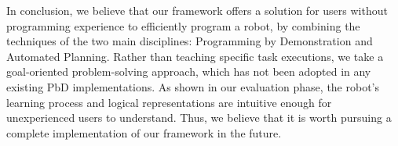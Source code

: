 In conclusion, we believe that our framework offers a solution for users without programming experience to efficiently program a robot, by combining the techniques of the two main disciplines: Programming by Demonstration and Automated Planning. Rather than teaching specific task executions, we take a goal-oriented problem-solving approach, which has not been adopted in any existing PbD implementations. As shown in our evaluation phase, the robot's learning process and logical representations are intuitive enough for unexperienced users to understand. Thus, we believe that it is worth pursuing a complete implementation of our framework in the future.

